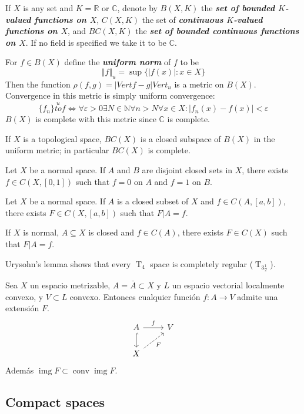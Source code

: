 \documentclass{article}
\theoremstyle{definition}
\numberwithin{equation}{section}
\newcommand{\R}{\mathbb{R}}
\newcommand{\N}{\mathbb{N}}
\newcommand{\C}{\mathbb{C}}
\DeclareMathOperator{\img}{img}
\begin{document}
	If $X$ is any set and $K=\R$ or $\C$, denote by $B(X,K)$ the \textbf{\textit{set of bounded $K$-valued functions on $X$}}, $C(X,K)$ the set of \textbf{\textit{continuous $K$-valued functions on $X$}}, and $BC(X,K)$ the \textbf{\textit{set of bounded continuous functions on $X$}}. If no field is specified we take it to be $\C$.
	
	For $f\in B(X)$ define the \textbf{\textit{uniform norm}} of $f$ to be
	\[\Vert f\Vert_u=\sup\{|f(x)|:x\in X\}\]
	Then the function $\rho(f,g)=|Vert f-g|Vert_u$ is a metric on $B(X)$. Convergence in this metric is simply uniform convergence:
	\[\{f_n\}\overset{u}{to}f\iff\forall\varepsilon>0\exists N\in\N\forall n>N\forall x\in X:|f_n(x)-f(x)|<\varepsilon\]
	$B(X)$ is complete with this metric since $\C$ is complete.
	
	\begin{prop}
		If $X$ is a topological space, $BC(X)$ is a closed subspace of $B(X)$ in the uniform metric; in particular $BC(X)$ is complete.
	\end{prop}
	\begin{lemma}[Urysohn]
		Let $X$ be a normal space. If $A$ and $B$ are disjoint closed sets in $X$, there exists $f\in C(X,[0,1])$ such that $f=0$ on $A$ and $f=1$ on $B$.
	\end{lemma}
	\begin{thm}
		Let $X$ be a normal space. If $A$ is a closed subset of $X$ and $f\in C(A,[a,b])$, there exists $F\in C(X,[a,b])$ such that $F|A=f$.
	\end{thm}
	\begin{coro}
		If $X$ is normal, $A\subseteq X$ is closed and $f\in C(A)$, there exists $F\in C(X)$ such that $F|A=f$.
	\end{coro}
	Urysohn's lemma shows that every $\operatorname{T}_4$ space is completely regular ($\operatorname{T}_{3\frac{1}{2}}$).
	\begin{thm}[Dugundji]
		Sea $X$ un espacio metrizable, $A=\bar{A}\subset X$ y $L$ un espacio vectorial localmente convexo, y $V\subset L$ convexo. Entonces cualquier función $f:A\to V$ admite una extensión $F$.
		\[\begin{tikzcd}
			A\arrow[r,"f"]\arrow[hook,d]&V\\
			X\arrow[ur,dashed,"F",swap]
		\end{tikzcd}\]
		Además $\img F\subset\operatorname{conv}\img F$.
	\end{thm}
	
	\subsection{Compact spaces}
	
\end{document}
